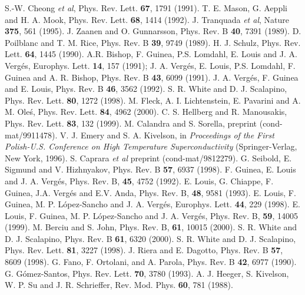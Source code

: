 \begin{thebibliography}{}
S.-W. Cheong {\it et al}, Phys. Rev. Lett.
{\bf 67}, 1791 (1991).
T. E. Mason, G. Aeppli and H. A. Mook, Phys. Rev. Lett.
{\bf 68}, 1414 (1992).
J. Tranquada {\it et al}, Nature {\bf 375}, 561 (1995).
J. Zaanen and O. Gunnarsson, Phys. Rev. B {\bf 40}, 7391 (1989).
D. Poilblanc and T. M. Rice, Phys. Rev. B {\bf 39}, 9749 (1989).
H. J. Schulz, Phys. Rev. Lett. {\bf 64}, 1445 (1990). 
A.R. Bishop, F. Guinea, P.S. Lomdahl, E. Louis and J. A. Verg\'es,
Europhys. Lett. {\bf 14}, 157 (1991);
J. A. Verg\'es, E. Louis, P.S. Lomdahl, F. Guinea and A. R. Bishop,
Phys. Rev. B {\bf 43}, 6099 (1991).
J. A. Verg\'es, F. Guinea and E. Louis, 
Phys. Rev. B {\bf 46}, 3562 (1992).
S. R. White and D. J. Scalapino, Phys. Rev. Lett.
{\bf 80}, 1272 (1998).
M. Fleck, A. I. Lichtenstein, E. Pavarini and A. M. Ole\'s,
Phys. Rev. Lett. {\bf 84}, 4962 (2000).
C. S. Hellberg and R. Manousakis, Phys. Rev. Lett.
{\bf 83}, 132 (1999).
M. Calandra and S. Sorella, preprint (cond-mat/9911478).
V. J. Emery and S. A. Kivelson, in {\sl Proceedings of the
First Polish-U.S. Conference on High Temperature Superconductivity}
(Springer-Verlag, New York, 1996).
S. Caprara {\it et al} preprint (cond-mat/9812279).
G. Seibold, E. Sigmund and V. Hizhnyakov, Phys. Rev. B
{\bf 57}, 6937 (1998).
F. Guinea, E. Louis and J. A. Verg\'es, Phys. Rev. B,
{\bf 45}, 4752 (1992).
E. Louis, G. Chiappe, F. Guinea, J.A. Verg\'es and E.V. Anda, Phys. Rev. B,
{\bf 48}, 9581 (1993).
E. Louis, F. Guinea, M. P. L\'opez-Sancho and J. A. Verg\'es,
Europhys. Lett. {\bf 44}, 229 (1998).
E. Louis, F. Guinea, M. P. L\'opez-Sancho and J. A. Verg\'es,
Phys. Rev. B, {\bf 59}, 14005 (1999).
M. Berciu and S. John, Phys. Rev. B, {\bf 61}, 10015 (2000). 
S. R. White and D. J. Scalapino, Phys. Rev. B {\bf 61}, 6320 (2000).
S. R. White and D. J. Scalapino, Phys. Rev. Lett. {\bf 81}, 3227 (1998).
J. Riera and E. Dagotto,
Phys. Rev. B {\bf 57}, 8609 (1998).
G. Fano, F. Ortolani, and A. Parola,
Phys. Rev. B {\bf 42}, 6977 (1990).
G. G\'omez-Santos, Phys. Rev. Lett. {\bf 70}, 3780 (1993).
A. J. Heeger, S. Kivelson, W. P. Su and J. R. Schrieffer,
Rev. Mod. Phys. {\bf 60}, 781 (1988).

\end{thebibliography}
